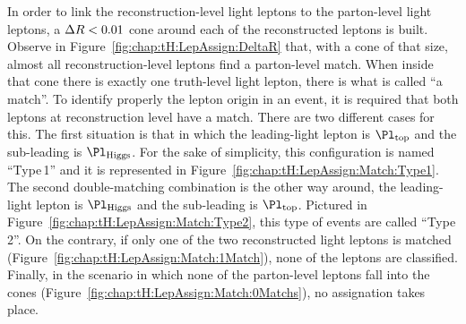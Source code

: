 In order to link the reconstruction-level light leptons to the parton-level light leptons, a \(\Delta R < 0.01\) cone around
each of the reconstructed leptons is built. Observe in Figure~\ref{fig:chap:tH:LepAssign:DeltaR} that, with a cone
of that size, almost all reconstruction-level leptons find a parton-level match.
When inside that cone there is exactly one truth-level light lepton,
there is what is called ``a match''. %
To identify properly the lepton origin in an event, it is required that both leptons
at reconstruction level have a match. There are two different cases for this.
The first situation is that in which the leading-light lepton is $\Pl_{\text{top}}$ and the sub-leading is $\Pl_{\text{Higgs}}$. For the 
sake of simplicity, this configuration is named ``Type$\,$1'' and it is represented in Figure~\ref{fig:chap:tH:LepAssign:Match:Type1}.
The second double-matching combination is the other way around, the leading-light lepton is $\Pl_{\text{Higgs}}$ and the sub-leading 
is $\Pl_{\text{top}}$. Pictured in Figure~\ref{fig:chap:tH:LepAssign:Match:Type2}, this type of events are called ``Type$\,$2''.
On the contrary, if only one of the two reconstructed light leptons is matched (Figure~\ref{fig:chap:tH:LepAssign:Match:1Match}),
none of the leptons are classified. %
Finally, in the scenario in which none of the parton-level leptons fall into the cones (Figure~\ref{fig:chap:tH:LepAssign:Match:0Matchs}), 
no assignation takes place. 


